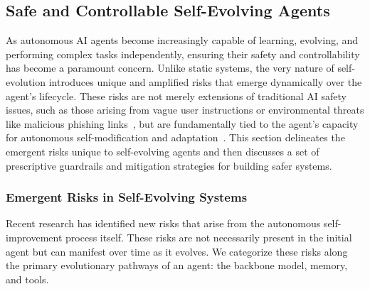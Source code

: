 \documentclass[10pt]{article} %
\begin{document}
\subsection{Safe and Controllable Self-Evolving Agents}



As autonomous AI agents become increasingly capable of learning, evolving, and performing complex tasks independently, ensuring their safety and controllability has become a paramount concern. Unlike static systems, the very nature of self-evolution introduces unique and amplified risks that emerge dynamically over the agent's lifecycle. These risks are not merely extensions of traditional AI safety issues, such as those arising from vague user instructions or environmental threats like malicious phishing links~\citep{zhou2025automating}, but are fundamentally tied to the agent's capacity for autonomous self-modification and adaptation~\citep{shao2025misevolution,han2025alignment}. This section delineates the emergent risks unique to self-evolving agents and then discusses a set of prescriptive guardrails and mitigation strategies for building safer systems.

\subsubsection{Emergent Risks in Self-Evolving Systems}
Recent research has identified new risks that arise from the autonomous self-improvement process itself. These risks are not necessarily present in the initial agent but can manifest over time as it evolves. We categorize these risks along the primary evolutionary pathways of an agent: the backbone model, memory, and tools.
\end{document}
